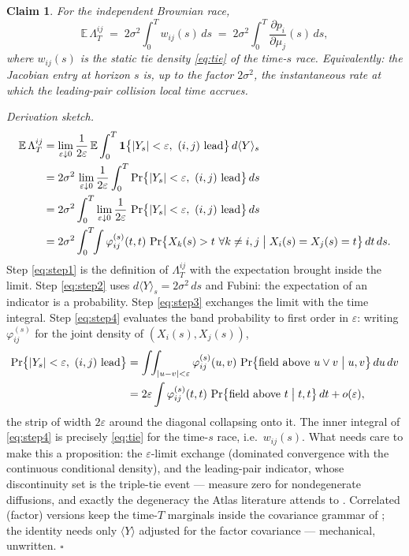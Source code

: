 \documentclass[11pt]{article}
\newtheorem{claim}{Claim}
\newcommand{\E}{\mathbb{E}}
\begin{document}
\begin{claim}\label{claim:main}
For the independent Brownian race,
\begin{equation}\label{eq:main}
\E\,\Lambda_T^{ij}
\;=\; 2\sigma^2 \int_0^T w_{ij}(s)\,ds
\;=\; 2\sigma^2 \int_0^T \frac{\partial p_i}{\partial\mu_j}(s)\,ds ,
\end{equation}
where $w_{ij}(s)$ is the static tie density \eqref{eq:tie} of the
time-$s$ race. Equivalently: the Jacobian entry at horizon $s$ is, up
to the factor $2\sigma^2$, the instantaneous rate at which the
leading-pair collision local time accrues.
\end{claim}

\emph{Derivation sketch.}
\begin{align}
\E\,\Lambda_T^{ij}
&= \lim_{\varepsilon\downarrow 0}\frac{1}{2\varepsilon}\,
   \E\int_0^T \mathbf 1\bigl\{|Y_s|<\varepsilon,\ (i,j)\ \text{lead}\bigr\}\,
   d\langle Y\rangle_s
   \label{eq:step1}\\
&= 2\sigma^2\,\lim_{\varepsilon\downarrow 0}\frac{1}{2\varepsilon}
   \int_0^T \Pr\bigl\{|Y_s|<\varepsilon,\ (i,j)\ \text{lead}\bigr\}\,ds
   \label{eq:step2}\\
&= 2\sigma^2 \int_0^T \lim_{\varepsilon\downarrow 0}\frac{1}{2\varepsilon}\,
   \Pr\bigl\{|Y_s|<\varepsilon,\ (i,j)\ \text{lead}\bigr\}\,ds
   \label{eq:step3}\\
&= 2\sigma^2 \int_0^T\!\!\int \varphi^{(s)}_{ij}(t,t)\,
   \Pr\bigl\{X_k(s)>t\ \forall k\ne i,j \bigm|
   X_i(s)=X_j(s)=t\bigr\}\,dt\,ds .
   \label{eq:step4}
\end{align}
Step \eqref{eq:step1} is the definition of $\Lambda_T^{ij}$ with the
expectation brought inside the limit. Step \eqref{eq:step2} uses
$d\langle Y\rangle_s = 2\sigma^2\,ds$ and Fubini: the expectation of
an indicator is a probability. Step \eqref{eq:step3} exchanges the
limit with the time integral. Step \eqref{eq:step4} evaluates the
band probability to first order in $\varepsilon$: writing
$\varphi^{(s)}_{ij}$ for the joint density of $(X_i(s),X_j(s))$,
\begin{align*}
\Pr\bigl\{|Y_s|<\varepsilon,\ (i,j)\ \text{lead}\bigr\}
&= \int\!\!\int_{|u-v|<\varepsilon} \varphi^{(s)}_{ij}(u,v)\,
\Pr\bigl\{\text{field above } u\vee v \bigm| u,v\bigr\}\,du\,dv\\
&= 2\varepsilon \int \varphi^{(s)}_{ij}(t,t)\,
\Pr\bigl\{\text{field above } t \bigm| t,t\bigr\}\,dt
+ o(\varepsilon),
\end{align*}
the strip of width $2\varepsilon$ around the diagonal collapsing onto
it. The inner integral of \eqref{eq:step4} is precisely \eqref{eq:tie}
for the time-$s$ race, i.e.\ $w_{ij}(s)$. What needs care to make this a proposition: the
$\varepsilon$-limit exchange (dominated convergence with the continuous
conditional density), and the leading-pair indicator, whose
discontinuity set is the triple-tie event --- measure zero for
nondegenerate diffusions, and exactly the degeneracy the Atlas
literature attends to \citep{ichiba2010}.
Correlated (factor) versions keep the time-$T$ marginals inside the
covariance grammar of \citet{cotton2026}; the identity needs only $\langle Y\rangle$ adjusted
for the factor covariance --- mechanical, unwritten. \hfill$\square$
\end{document}
